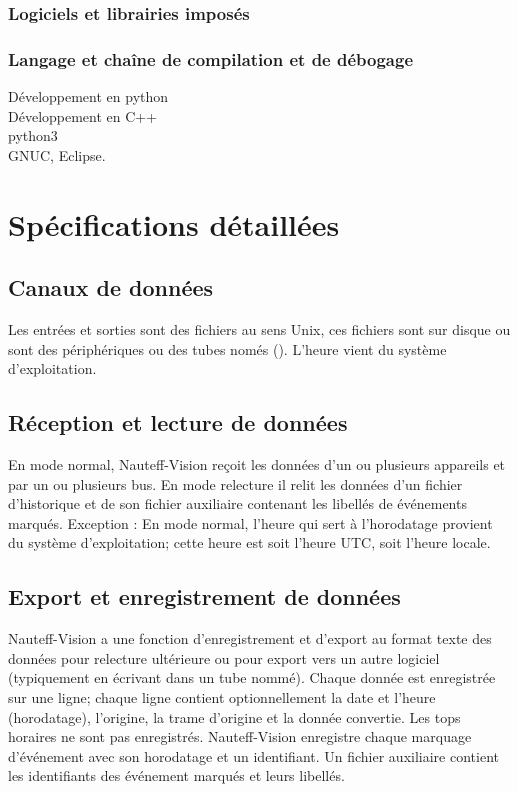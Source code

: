 \documentclass[a4paper,11pt]{report}
\begin{document}
\subsection{Logiciels et librairies imposés}
\subsection{Langage et chaîne de compilation et de débogage}
Développement en python \\
Développement en C++ \\
python3\\
GNUC, Eclipse.\\


\chapter{Spécifications détaillées}

\section{Canaux de données}

Les entrées et sorties sont des fichiers au sens Unix, ces fichiers
sont sur disque ou sont des périphériques ou des tubes només ().
L'heure vient du système d'exploitation.


\section{Réception et lecture de données}

En mode normal, Nauteff-Vision reçoit les données d'un ou plusieurs appareils et par un ou plusieurs bus.
En mode relecture il relit les données d'un fichier d'historique et de son fichier auxiliaire
contenant les libellés de événements marqués.
Exception : En mode normal, l'heure qui sert à l'horodatage provient du système d'exploitation;
cette heure est soit l'heure UTC, soit l'heure locale.

\section{Export et enregistrement de données}

Nauteff-Vision a une fonction d'enregistrement et d'export
au format texte des données pour relecture ultérieure 
ou pour export vers un autre logiciel
(typiquement en écrivant dans un tube nommé).
Chaque donnée est enregistrée sur une ligne;
chaque ligne contient optionnellement la date et l'heure (horodatage),
l'origine, la trame d'origine et la donnée convertie.
Les tops horaires ne sont pas enregistrés.
Nauteff-Vision enregistre chaque marquage d'événement avec son horodatage et un identifiant.
Un fichier auxiliaire contient les identifiants des événement
marqués et leurs libellés.
\end{document}
